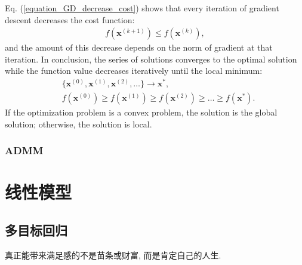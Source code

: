\documentclass[lang=cn,10pt]{gorgeousnbook}
\numberwithin{equation}{section}%
\numberwithin{figure}{section}%
\begin{document}
Eq. (\ref{equation_GD_decrease_cost}) shows that every iteration of gradient descent decreases the cost function:
\begin{align}
f(\boldsymbol{x}^{(k+1)}) \leq f(\boldsymbol{x}^{(k)}),
\end{align}
and the amount of this decrease depends on the norm of gradient at that iteration. 
In conclusion, the series of solutions converges to the optimal solution while the function value decreases iteratively until the local minimum:
\begin{align*}
& \{\boldsymbol{x}^{(0)}, \boldsymbol{x}^{(1)}, \boldsymbol{x}^{(2)}, \dots\} \rightarrow \boldsymbol{x}^*, \\
& f(\boldsymbol{x}^{(0)}) \geq f(\boldsymbol{x}^{(1)}) \geq f(\boldsymbol{x}^{(2)}) \geq \dots \geq f(\boldsymbol{x}^*).
\end{align*}
If the optimization problem is a convex problem, the solution is the global solution; otherwise, the solution is local. 


\section{ADMM}




\mainmatter
{}
\part{线性模型}



\chapter{多目标回归}
\vspace{0.5in}
\begin{center}
    \textcolor[RGB]{255, 0, 0}{\faHeart}真正能带来满足感的不是苗条或财富, 而是肯定自己的人生.\textcolor[RGB]{255, 0, 0}{\faHeart}
\end{center}

\begin{center}
\end{center}
\end{document}
